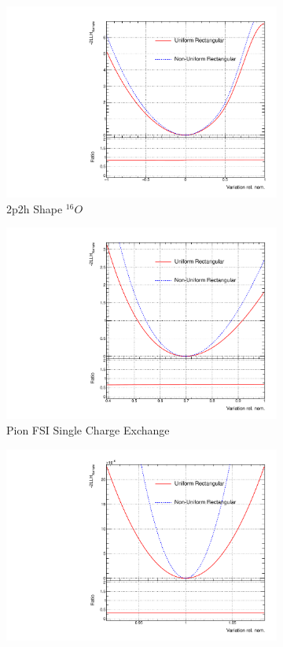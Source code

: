 \begin{figure}[h]
\centering
\begin{subfigure}{.49\textwidth}
  \centering
  \includegraphics[width=0.95\linewidth]{figs/2p2h_shape_O_sampolyLLH}
  \caption{2p2h Shape $^{16}O$}
  \label{fig:2p2h_shape_O_sampolyLLH}
\end{subfigure}
\begin{subfigure}{.49\textwidth}
  \centering
  \includegraphics[width=0.95\linewidth]{figs/FEFCX_sampolyLLH}
  \caption{Pion FSI Single Charge Exchange}
  \label{fig:FEFCX_sampolyLLH}
\end{subfigure}
\begin{subfigure}{.49\textwidth}
  \centering
  \includegraphics[width=0.95\linewidth]{figs/b_18_sampolyLLH}

\end{subfigure}
\end{figure}

